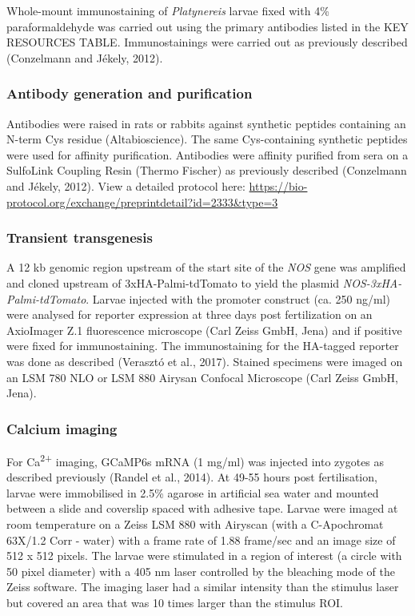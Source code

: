 \documentclass[
  11pt,
  letterpaper,
  DIV=11,
  numbers=noendperiod]{scrartcl}
\begin{document}
Whole-mount immunostaining of \emph{Platynereis} larvae fixed with 4\%
paraformaldehyde was carried out using the primary antibodies listed in
the KEY RESOURCES TABLE. Immunostainings were carried out as previously
described (Conzelmann and Jékely, 2012).

\subsubsection{Antibody generation and
purification}\label{antibody-generation-and-purification}

Antibodies were raised in rats or rabbits against synthetic peptides
containing an N-term Cys residue (Altabioscience). The same
Cys-containing synthetic peptides were used for affinity purification.
Antibodies were affinity purified from sera on a SulfoLink Coupling
Resin (Thermo Fischer) as previously described (Conzelmann and Jékely,
2012). View a detailed protocol here:
\url{https://bio-protocol.org/exchange/preprintdetail?id=2333&type=3}

\subsubsection{Transient transgenesis}\label{transient-transgenesis}

A 12 kb genomic region upstream of the start site of the \emph{NOS} gene
was amplified and cloned upstream of 3xHA-Palmi-tdTomato to yield the
plasmid \emph{NOS-3xHA-Palmi-tdTomato}. Larvae injected with the
promoter construct (ca. 250 ng/ml) were analysed for reporter expression
at three days post fertilization on an AxioImager Z.1 fluorescence
microscope (Carl Zeiss GmbH, Jena) and if positive were fixed for
immunostaining. The immunostaining for the HA-tagged reporter was done
as described (Verasztó et al., 2017). Stained specimens were imaged on
an LSM 780 NLO or LSM 880 Airysan Confocal Microscope (Carl Zeiss GmbH,
Jena).

\subsubsection{Calcium imaging}\label{calcium-imaging}

For Ca\textsuperscript{2+} imaging, GCaMP6s mRNA (1 mg/ml) was injected
into zygotes as described previously (Randel et al., 2014). At 49-55
hours post fertilisation, larvae were immobilised in 2.5\% agarose in
artificial sea water and mounted between a slide and coverslip spaced
with adhesive tape. Larvae were imaged at room temperature on a Zeiss
LSM 880 with Airyscan (with a C-Apochromat 63X/1.2 Corr - water) with a
frame rate of 1.88 frame/sec and an image size of 512 x 512 pixels. The
larvae were stimulated in a region of interest (a circle with 50 pixel
diameter) with a 405 nm laser controlled by the bleaching mode of the
Zeiss software. The imaging laser had a similar intensity than the
stimulus laser but covered an area that was 10 times larger than the
stimulus ROI.
\end{document}
